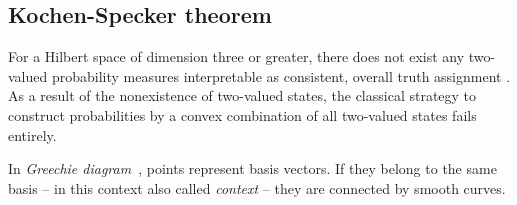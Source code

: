\subsection{Kochen-Specker theorem}
\label{2011-m-KST}

For a Hilbert space of dimension three or greater,
there does not exist any
two-valued probability measures interpretable as consistent, overall truth assignment
\cite[-40mm]{specker-60,kochen1}.
As a result of the nonexistence of two-valued states, the classical strategy
to construct probabilities by a convex combination of all two-valued states fails entirely.

In  {\em Greechie diagram}~\cite[-5mm]{greechie:71},
points  represent basis vectors.
If they belong to the same basis -- in this context also called {\em context} -- they are connected by  smooth curves.



